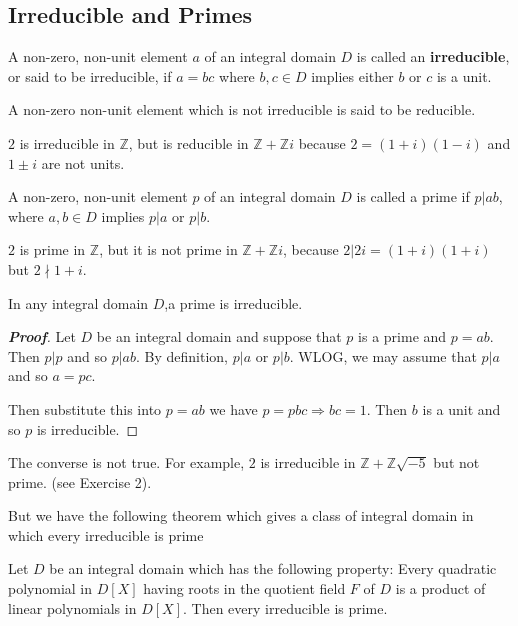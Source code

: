 \subsection{Irreducible and Primes}
\begin{definition} A non-zero, non-unit element $a$ of an integral domain $D$ is called an {\bf irreducible}, or said to be irreducible, if $a=bc$ where $b,c \in D$ implies either $b$ or $c$ is a unit.

A non-zero non-unit element which is not irreducible is said to be reducible.
\end{definition}
\begin{example} $2$ is irreducible in $\mathbb{Z}$, but is reducible in $\mathbb{Z}+\mathbb{Z}i$ because $2=(1+i)(1-i)$ and $1 \pm i$ are not units.
\end{example}
\begin{definition} A non-zero, non-unit element $p$ of an integral domain $D$ is called a prime if
$p | ab$, where $a,b \in D$ implies $p | a$ or $p|b$.
\end{definition}
\begin{example} $2$ is prime in $\mathbb{Z}$, but it is not prime in $\mathbb{Z}+\mathbb{Z}i$, because
$2|2i=(1+i)(1+i)$ but $2 \nmid 1+i$.
\end{example}
\begin{theorem} In any integral domain $D$,a prime is irreducible.
\end{theorem}
\begin{proof}[\bf Proof] Let $D$ be an integral domain and suppose that $p$ is a prime and $p=ab$. Then $p|p$ and so $p|ab$. By definition, $p|a$ or $p|b$. WLOG, we may assume that $p|a$ and so $a=pc$.

Then substitute this into $p=ab$ we have $p=pbc \Rightarrow bc=1$. Then $b$ is a unit and so $p$ is irreducible.
\end{proof}
\begin{remark} The converse is not true. For example, $2$ is irreducible in $\mathbb{Z}+\mathbb{Z}\sqrt{-5}$ but not prime. (see Exercise 2).
\end{remark}
But we have the following theorem which gives a class of integral domain in which every irreducible is prime
\begin{theorem} Let $D$ be an integral domain which has the following property:
Every quadratic polynomial in $D[X]$ having roots in the quotient field $F$ of $D$ is a product of
linear polynomials in $D[X]$.
Then every irreducible is prime.
\end{theorem}
